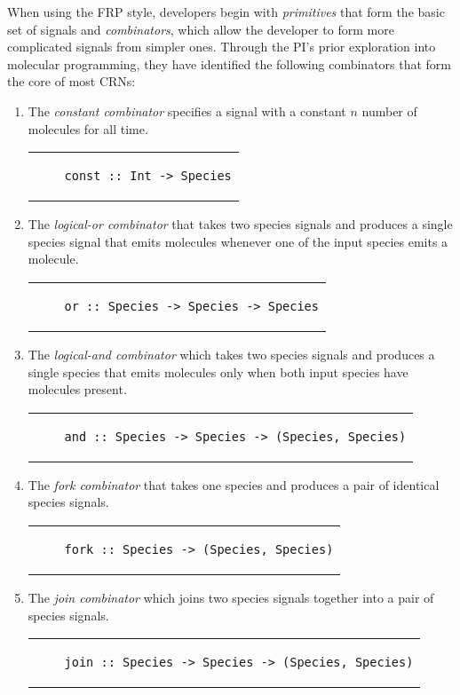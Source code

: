 When using the FRP style, developers begin with \emph{primitives} that form the basic set of signals and \emph{combinators}, which allow the developer to form more complicated signals from simpler ones.
Through the PI's prior exploration into molecular programming, they have identified the following combinators that form the core of most CRNs:
\begin{enumerate}[wide, labelwidth=!, labelindent=0pt]
  \item The \emph{constant combinator} specifies a signal with a constant \( n \) number of molecules for all time.
  \begin{center}\begin{tabular}{c}\begin{lstlisting}
    const :: Int -> Species
  \end{lstlisting}\end{tabular}\end{center}
  \item The \emph{logical-or combinator} that takes two species signals and produces a single species signal that emits molecules whenever one of the input species emits a molecule.
  \begin{center}\begin{tabular}{c}\begin{lstlisting}
    or :: Species -> Species -> Species
  \end{lstlisting}\end{tabular}\end{center}
  \item The \emph{logical-and combinator} which takes two species signals and produces a single species that emits molecules only when both input species have molecules present.
  \begin{center}\begin{tabular}{c}\begin{lstlisting}
    and :: Species -> Species -> (Species, Species)
  \end{lstlisting}\end{tabular}\end{center}
  \item The \emph{fork combinator} that takes one species and produces a pair of identical species signals.
  \begin{center}\begin{tabular}{c}\begin{lstlisting}
    fork :: Species -> (Species, Species)
  \end{lstlisting}\end{tabular}\end{center}
  \item The \emph{join combinator} which joins two species signals together into a pair of species signals.
  \begin{center}\begin{tabular}{c}\begin{lstlisting}
    join :: Species -> Species -> (Species, Species)
  \end{lstlisting}\end{tabular}\end{center}
\end{enumerate}

